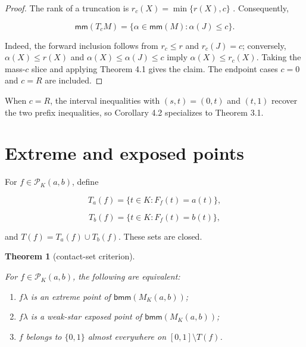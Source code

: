 \documentclass[11pt]{article}
\newtheorem{theorem}{Theorem}[section]
\numberwithin{equation}{section}
\begin{document}
\begin{proof}

The rank of a truncation is $r_c(X)=\min\{r(X),c\}$ \cite{berczi2026}. Consequently,

\nopagebreak[4]
\[
\mathsf{mm}(T_cM)
=\{\alpha\in\mathsf{mm}(M):\alpha(J)\le c\}.
\]

Indeed, the forward inclusion follows from $r_c\le r$ and $r_c(J)=c$; conversely,
$\alpha(X)\le r(X)$ and $\alpha(X)\le\alpha(J)\le c$ imply
$\alpha(X)\le r_c(X)$. Taking the mass-$c$ slice and applying Theorem 4.1 gives the
claim. The endpoint cases $c=0$ and $c=R$ are included.
\end{proof}


When $c=R$, the interval inequalities with $(s,t)=(0,t)$ and $(t,1)$ recover the
two prefix inequalities, so Corollary 4.2 specializes to Theorem 3.1.

\section{Extreme and exposed points}


For $f\in\mathcal P_K(a,b)$, define

\nopagebreak[4]
\[
T_a(f)=\{t\in K:F_f(t)=a(t)\},
\]

\nopagebreak[4]
\[
T_b(f)=\{t\in K:F_f(t)=b(t)\},
\]

and $T(f)=T_a(f)\cup T_b(f)$. These sets are closed.

\begin{theorem}[contact-set criterion]
\label{thm:contact}

For $f\in\mathcal P_K(a,b)$, the following are equivalent:

\begin{enumerate}
\item $f\lambda$ is an extreme point of $\mathsf{bmm}(M_K(a,b))$;
\item $f\lambda$ is a weak-star exposed point of $\mathsf{bmm}(M_K(a,b))$;
\item $f$ belongs to $\{0,1\}$ almost everywhere on $[0,1]\setminus T(f)$.

\end{enumerate}

\end{theorem}
\end{document}
